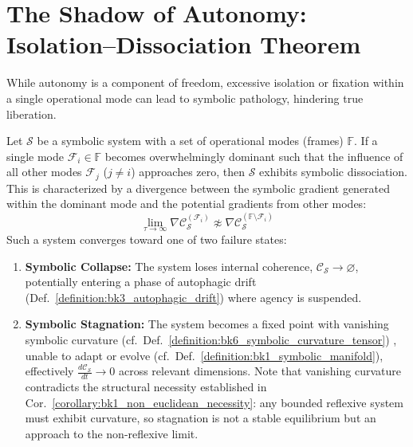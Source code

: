 \section{The Shadow of Autonomy: Isolation–Dissociation Theorem}
\label{sec:bk9_shadow_of_autonomy}
While autonomy is a component of freedom, excessive isolation or fixation within a single operational mode can lead to symbolic pathology, hindering true liberation.
\begin{theorem}
\label{theorem:bk9_isolation_dissociation_theorem}
Let $\mathcal{S}$ be a symbolic system with a set of operational modes (frames) $\mathbb{F}$. If a single mode $\mathcal{F}_i \in \mathbb{F}$ becomes overwhelmingly dominant such that the influence of all other modes $\mathcal{F}_j$ ($j \ne i$) approaches zero, then $\mathcal{S}$ exhibits symbolic dissociation. This is characterized by a divergence between the symbolic gradient generated within the dominant mode and the potential gradients from other modes:
\[
\lim_{\tau \to \infty} \nabla \mathcal{C}_{\mathcal{S}}^{(\mathcal{F}_i)} \not\approx \nabla \mathcal{C}_{\mathcal{S}}^{(\mathbb{F} \setminus \mathcal{F}_i)}
\]
Such a system converges toward one of two failure states:
\begin{enumerate}
    \item \textbf{Symbolic Collapse:} The system loses internal coherence, $\mathcal{C}_{\mathcal{S}} \to \varnothing$, potentially entering a phase of autophagic drift (Def.~\ref{definition:bk3_autophagic_drift}) where agency is suspended.
    \item \textbf{Symbolic Stagnation:} The system becomes a fixed point with vanishing symbolic curvature (cf.~Def.~\ref{definition:bk6_symbolic_curvature_tensor})
\label{axiom:bk9_reflection_curvature_coherence}, unable to adapt or evolve (cf.~Def.~\ref{definition:bk1_symbolic_manifold}), effectively $\frac{d\mathcal{C}_{\mathcal{S}}}{dt} \to 0$ across relevant dimensions. Note that vanishing curvature contradicts the structural necessity established in Cor.~\ref{corollary:bk1_non_euclidean_necessity}: any bounded reflexive system must exhibit curvature, so stagnation is not a stable equilibrium but an approach to the non-reflexive limit.
\end{enumerate}
\end{theorem}
